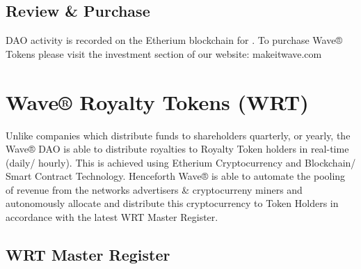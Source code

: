 \documentclass[letterpaper,10pt,english]{sphinxmanual}
\begin{document}
\subsection{Review \& Purchase}
\label{\detokenize{introduction:review-purchase}}
DAO activity is recorded on the Etherium blockchain for .
To purchase Wave® Tokens please visit the investment section of our website: makeitwave.com


\section{Wave® Royalty Tokens (WRT)}
\label{\detokenize{investors:wave-royalty-tokens-wrt}}\label{\detokenize{investors::doc}}
Unlike companies which distribute funds to shareholders quarterly, or yearly, the Wave® DAO is able to distribute royalties to Royalty Token holders in real-time (daily/ hourly).
This is achieved using Etherium Cryptocurrency and Blockchain/ Smart Contract Technology.
Henceforth Wave® is able to automate the pooling of revenue from the networks advertisers \& cryptocurreny miners and autonomously allocate and distribute this cryptocurrency to Token Holders in accordance with the latest WRT Master Register.


\subsection{WRT Master Register}
\label{\detokenize{investors:wrt-master-register}}
\end{document}
